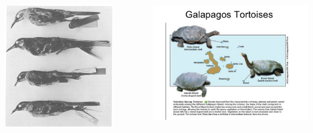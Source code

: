 \documentclass[10pt]{beamer}
\begin{document}
\begin{frame}
	\begin{columns}
		\begin{column}{0.5\textwidth}
			\begin{center}
				\includegraphics[width=0.8\textwidth]{figures/mockingbirds.png}
			\end{center}
		\end{column}
		
		\begin{column}{0.5\textwidth}
			\begin{center}
				\includegraphics[width=1.0\textwidth]{figures/tortoises.jpg}
			\end{center}
		\end{column}
	\end{columns}
\end{frame}  
\end{document}

